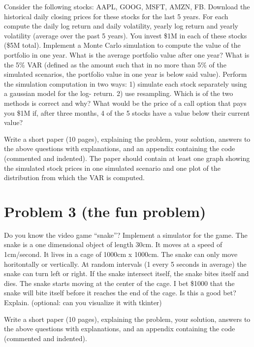 \documentclass[12pt]{article}
\begin{document}
Consider the following stocks: AAPL, GOOG, MSFT, AMZN, FB. Download the historical daily closing prices for these stocks for the last 5 years. For each compute the daily log return and daily volatility, yearly log return and yearly volatility (average over the past 5 years). You invest \$1M in each of these stocks (\$5M total). Implement a Monte Carlo simulation to compute the value of the portfolio in one year. What is the average portfolio value after one year? What is the 5\% VAR (defined as the amount such that in no more than 5\% of the simulated scenarios, the portfolio value in one year is below said value). Perform the simulation computation in two ways: 1) simulate each stock separately using a gaussian model for the log- return. 2) use resampling. Which is of the two methods is correct and why? What would be the price of a call option that pays you \$1M if, after three months, 4 of the 5 stocks have a value below their current value?

Write a short paper (10 pages), explaining the problem, your solution, answers to the above questions with explanations, and an appendix containing the code (commented and indented). The paper should contain at least one graph showing the simulated stock prices in one simulated scenario and one plot of the distribution from which the VAR is computed.

\section*{Problem 3 (the fun problem)}

Do you know the video game ``snake''? Implement a simulator for the game. The snake is a one dimensional object of length 30cm. It moves at a speed of 1cm/second. It lives in a cage of 1000cm x 1000cm. The snake can only move horitontally or vertically. At random intervals (1 every 5 seconds in average) the snake can turn left or right. If the snake intersect itself, the snake bites itself and dies. The snake starts moving at the center of the cage. I bet \$1000 that the snake will bite itself before it reaches the end of the cage. Is this a good bet? Explain. (optional: can you visualize it with tkinter)

Write a short paper (10 pages), explaining the problem, your solution, answers to the above questions with explanations, and an appendix containing the code (commented and indented).
\end{document}

